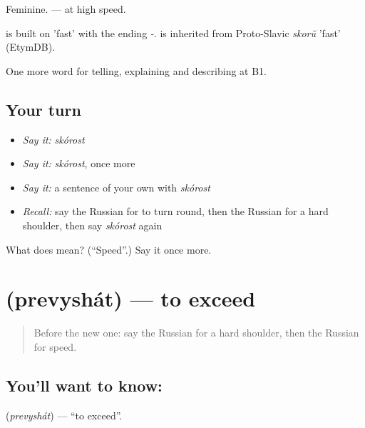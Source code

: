 Feminine. \emph{  } — at high speed.

\begin{cousinweb}
\emph{} is built on \emph{} 'fast' with the ending \emph{-}. \emph{} is inherited from Proto-Slavic \emph{skorŭ} 'fast' (EtymDB).
\end{cousinweb}

\begin{grammarlens}[title={What you've built}]
One more word for telling, explaining and describing at B1.
\end{grammarlens}

\subsection*{Your turn}
\begin{itemize}
\raggedright
  \item \emph{Say it:} \emph{skórost}
  \item \emph{Say it:} \emph{skórost}, once more
  \item \emph{Say it:} a sentence of your own with \emph{skórost}
  \item \emph{Recall:} say the Russian for to turn round, then the Russian for a hard shoulder, then say \emph{skórost} again
\end{itemize}

\begin{tcolorbox}[breakable,colback=teal!4,colframe=teal!35!black,title={Before you move on}]
What does  mean? (\textquotedblleft{}Speed\textquotedblright{}.) Say it once more.
\end{tcolorbox}
\section[\texorpdfstring{\ru{превышать} (prevyshát)}{превышать (prevyshát)}]{ (prevyshát) — to exceed}

\label{lesson:RU-C408-prevyshat}



\begin{quote}
Before the new one: say the Russian for a hard shoulder, then the Russian for speed.
\end{quote}

\subsection*{You'll want to know: }
\textbf{} (\emph{prevyshát}) — \textquotedblleft{}to exceed\textquotedblright{}.


